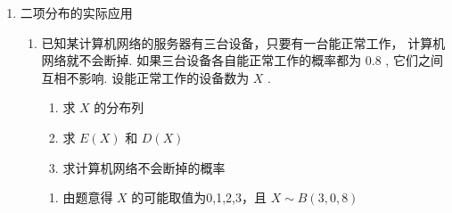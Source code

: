 \begin{enumerate}
\begin{enumerate}
        \begin{jieda}
            对于$A, B$，设$X_n = \dfrac{{\xi }_{n}+n}{2}$，则$X_n \sim B\left(n, \dfrac{1}{2}\right)$，$\left\{\begin{array}{l}
                 E(X_n) = \dfrac{n}{2} \\
                 D(X_n) = \dfrac{n}{4}
            \end{array}\right.$，故$\left\{\begin{array}{l}
                 E(\xi_n) = 0 \\
                 D(\xi_n) = n
            \end{array}\right.$，故$A, B$正确

            对于 ${C}$ ,因为 $P\left( {{\xi }_{100} = 0}\right)  = {{C}}_{100}^{50}{\left( \dfrac{1}{2}\right) }^{100},P\left( {{\xi }_{100} = 2}\right)  = {{C}}_{100}^{51}{\left( \dfrac{1}{2}\right) }^{100}$ ,
            
            所以 $\dfrac{P\left( {{\xi }_{100} = 0}\right) }{P\left( {{\xi }_{100} = 2}\right) } = \dfrac{{{C}}_{100}^{50}}{{{C}}_{100}^{51}} = \dfrac{51}{50} > 1$ ,所以 $P\left( {{\xi }_{100} = 0}\right)  > P\left( {{\xi }_{100} = 2}\right)$ ,所以 ${C}$ 错误
            
            对于 ${D}$ ，因为 $P\left( {{\xi }_{100} = 0}\right)  = {{C}}_{100}^{50}{\left( \dfrac{1}{2}\right) }^{100},P\left( {{\xi }_{102} = 0}\right)  = {{C}}_{102}^{51}{\left( \dfrac{1}{2}\right) }^{102}$ ，
            
            所以 $\dfrac{P\left( {{\xi }_{100} = 0}\right) }{P\left( {{\xi }_{102} = 0}\right) } = \dfrac{4{{C}}_{100}^{50}}{{{C}}_{102}^{51}} = \dfrac{4 \times  {51} \times  {51}}{{102} \times  {101}} = \dfrac{102}{101} > 1$ ,
            
            所以 $P\left( {{\xi }_{102} = 0}\right)  < P\left( {{\xi }_{100} = 0}\right)$ ,所以 D 正确
        \end{jieda}
    \end{enumerate}
    \item 二项分布的实际应用
    \begin{enumerate}
        \item 已知某计算机网络的服务器有三台设备，只要有一台能正常工作， 计算机网络就不会断掉. 如果三台设备各自能正常工作的概率都为 0.8 , 它们之间互相不影响. 设能正常工作的设备数为 $X$ .
        \begin{enumerate}
            \item 求 $X$ 的分布列
            \item 求 $E\left( X\right)$ 和 $D\left( X\right)$
            \item 求计算机网络不会断掉的概率
        \end{enumerate}
        \begin{jieda}
            \begin{enumerate}
                \item 由题意得 $X$ 的可能取值为0,1,2,3，且 $X \sim  B\left( {3,0,8}\right)$
                

\end{enumerate}
\end{jieda}
\end{enumerate}
\end{enumerate}

